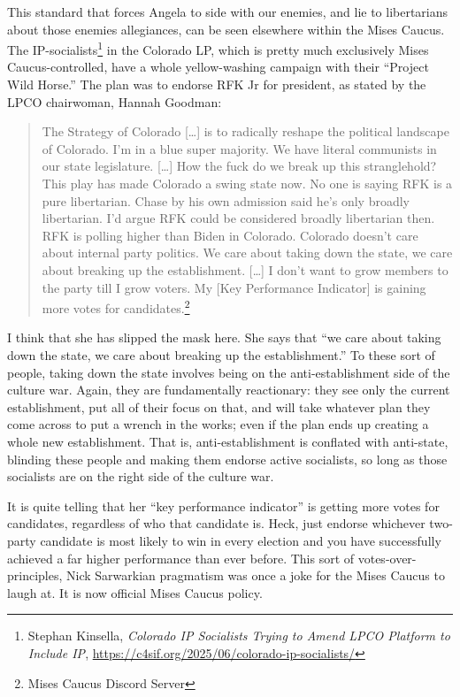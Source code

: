 \documentclass[11pt]{article}
\begin{document}
This standard that forces Angela to side with our enemies, and lie to libertarians about those enemies allegiances, can be seen elsewhere within the Mises Caucus. The IP-socialists\footnote{Stephan Kinsella, \emph{Colorado IP Socialists Trying to Amend LPCO Platform to Include IP}, \url{https://c4sif.org/2025/06/colorado-ip-socialists/}} in the Colorado LP, which is pretty much exclusively Mises Caucus-controlled, have a whole yellow-washing campaign with their ``Project Wild Horse.'' The plan was to endorse RFK Jr for president, as stated by the LPCO chairwoman, Hannah Goodman:
\begin{quote}
The Strategy of Colorado [\ldots{}] is to radically reshape the political landscape of Colorado. I'm in a blue super majority. We have literal communists in our state legislature. [\ldots{}] How the fuck do we break up this stranglehold? This play has made Colorado a swing state now. No one is saying RFK is a pure libertarian. Chase by his own admission said he's only broadly libertarian. I'd argue RFK could be considered broadly libertarian then. RFK is polling higher than Biden in Colorado. Colorado doesn't care about internal party politics. We care about taking down the state, we care about breaking up the establishment. [\ldots{}] I don't want to grow members to the party till I grow voters. My [Key Performance Indicator] is gaining more votes for candidates.\footnote{Mises Caucus Discord Server}
\end{quote}

I think that she has slipped the mask here. She says that ``we care about taking down the state, we care about breaking up the establishment.'' To these sort of people, taking down the state involves being on the anti-establishment side of the culture war. Again, they are fundamentally reactionary: they see only the current establishment, put all of their focus on that, and will take whatever plan they come across to put a wrench in the works; even if the plan ends up creating a whole new establishment. That is, anti-establishment is conflated with anti-state, blinding these people and making them endorse active socialists, so long as those socialists are on the right side of the culture war.

It is quite telling that her ``key performance indicator'' is getting more votes for candidates, regardless of who that candidate is. Heck, just endorse whichever two-party candidate is most likely to win in every election and you have successfully achieved a far higher performance than ever before. This sort of votes-over-principles, Nick Sarwarkian pragmatism was once a joke for the Mises Caucus to laugh at. It is now official Mises Caucus policy.
\end{document}

